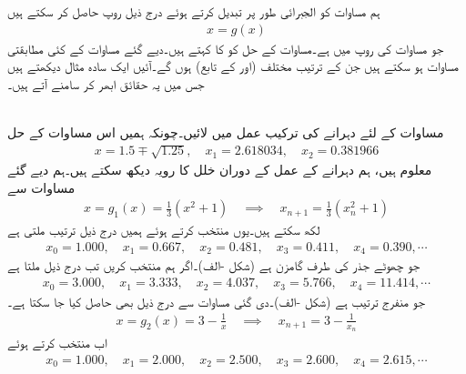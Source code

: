  ہم مساوات  کو الجبرائی طور پر تبدیل کرتے ہوئے درج ذیل روپ حاصل کر سکتے ہیں
\begin{align}\label{مساوات_اعدادی_تفاعل_پ}
x=g(x)
\end{align}
جو مساوات   کی روپ میں ہے۔مساوات  کے حل کو  کا  کہتے ہیں۔دیے گئے مساوات  کے کئی مطابقتی مساوات  ہو سکتے ہیں جن کے ترتیب  مختلف (اور  کے تابع) ہوں گے۔آئیں ایک سادہ مثال دیکھتے ہیں جس میں یہ حقائق ابھر کر سامنے آتے ہیں۔

\quad {}\\
مساوات  کے لئے دہرانے کی ترکیب عمل میں لائیں۔چونکہ ہمیں اس مساوات کے حل
\begin{align*}
x=1.5\mp\sqrt{1.25},\quad x_1=\num{2.618034},\quad x_2=\num{0.381966}
\end{align*}
معلوم ہیں، ہم دہرانے کے عمل کے دوران خلل کا رویہ دیکھ سکتے ہیں۔ہم دیے گئے مساوات سے
\begin{align}\label{مساوات_مثال_اعدادی_دہرانا_الف}
x=g_1(x)=\frac{1}{3}(x^2+1)\quad \implies \quad x_{n+1}=\frac{1}{3}(x_n^2+1)
\end{align}
لکھ سکتے ہیں۔یوں  منتخب کرتے ہوئے ہمیں درج ذیل ترتیب ملتی ہے
\begin{align*}
x_0=\num{1.000},\quad x_1=\num{0.667},\quad x_2=\num{0.481},\quad x_3=\num{0.411},\quad x_4=\num{0.390}, \cdots
\end{align*}
جو چھوٹے جذر کی طرف گامزن ہے (شکل -الف)۔اگر ہم  منتخب کریں تب درج ذیل ملتا ہے
\begin{align*}
x_0=\num{3.000},\quad x_1=\num{3.333},\quad x_2=\num{4.037},\quad x_3=\num{5,766},\quad x_4=\num{11.414}, \cdots
\end{align*}
جو منفرج ترتیب ہے (شکل -الف)۔دی گئی مساوات سے درج ذیل بھی حاصل کیا جا سکتا ہے۔
\begin{align}\label{مساوات_مثال_اعدادی_دہرانا_ب}
x=g_2(x)=3-\frac{1}{x}\quad \implies \quad x_{n+1}=3-\frac{1}{x_n}
\end{align}
اب  منتخب کرتے ہوئے
\begin{align*}
x_0=\num{1.000},\quad x_1=\num{2.000},\quad x_2=\num{2.500},\quad x_3=\num{2.600},\quad x_4=\num{2.615}, \cdots
\end{align*}
